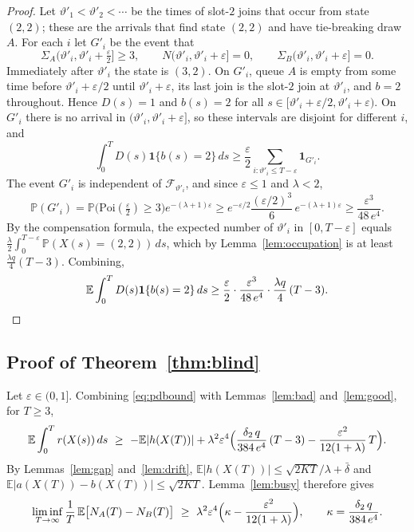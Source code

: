 \documentclass[11pt]{article}
\theoremstyle{definition}
\theoremstyle{remark}
\newcommand{\E}{\mathbb{E}}
\renewcommand{\Pr}{\mathbb{P}}
\newcommand{\ind}{\mathbf{1}}
\newcommand{\cF}{\mathcal{F}}
\newcommand{\SvA}{\Sigma_A}
\newcommand{\SvB}{\Sigma_B}
\newcommand{\Poi}{\mathrm{Poi}}
\begin{document}
\begin{proof}
Let $\vartheta'_1<\vartheta'_2<\cdots$ be the times of slot-$2$ joins that
occur from state $(2,2)$; these are the arrivals that find state $(2,2)$ and
have tie-breaking draw $A$. For each $i$ let $G'_i$ be the event that
\[
  \SvA(\vartheta'_i,\vartheta'_i+\tfrac{\varepsilon}{2}]\ge3,\qquad
  N(\vartheta'_i,\vartheta'_i+\varepsilon]=0,\qquad
  \SvB(\vartheta'_i,\vartheta'_i+\varepsilon]=0 .
\]
Immediately after $\vartheta'_i$ the state is $(3,2)$. On $G'_i$, queue $A$ is
empty from some time before $\vartheta'_i+\varepsilon/2$ until
$\vartheta'_i+\varepsilon$, its last join is the slot-$2$ join at
$\vartheta'_i$, and $b=2$ throughout. Hence $D(s)=1$ and $b(s)=2$ for all
$s\in[\vartheta'_i+\varepsilon/2,\vartheta'_i+\varepsilon)$. On $G'_i$ there is
no arrival in $(\vartheta'_i,\vartheta'_i+\varepsilon]$, so these intervals are
disjoint for different $i$, and
\[
  \int_0^T D(s)\ind\{b(s)=2\}\,ds\ge\frac{\varepsilon}{2}
  \sum_{i:\vartheta'_i\le T-\varepsilon}\ind_{G'_i}.
\]
The event $G'_i$ is independent of $\cF_{\vartheta'_i}$, and since
$\varepsilon\le1$ and $\lambda<2$,
\[
  \Pr(G'_i)=\Pr\bigl(\Poi(\tfrac{\varepsilon}{2})\ge3\bigr)e^{-(\lambda+1)\varepsilon}
  \ge e^{-\varepsilon/2}\frac{(\varepsilon/2)^3}{6}\,e^{-(\lambda+1)\varepsilon}
  \ge\frac{\varepsilon^{3}}{48\,e^{4}} .
\]
By the compensation formula, the expected number of $\vartheta'_i$ in
$[0,T-\varepsilon]$ equals
$\frac{\lambda}{2}\int_0^{T-\varepsilon}\Pr(X(s)=(2,2))\,ds$, which by
Lemma~\ref{lem:occupation} is at least $\frac{\lambda q}{4}(T-3)$. Combining,
\[
  \E\int_0^T D(s)\ind\{b(s)=2\}\,ds\ge\frac{\varepsilon}{2}\cdot
  \frac{\varepsilon^{3}}{48\,e^{4}}\cdot\frac{\lambda q}{4}\,(T-3).\qedhere
\]
\end{proof}

\subsection{Proof of Theorem~\ref{thm:blind}}

Let $\varepsilon\in(0,1]$. Combining \eqref{eq:pdbound} with
Lemmas~\ref{lem:bad} and~\ref{lem:good}, for $T\ge3$,
\[
  \E\int_0^T r(X(s))\,ds\ \ge\ -\E|h(X(T))|
  +\lambda^{2}\varepsilon^{4}\Bigl(\frac{\delta_2\,q}{384\,e^{4}}\,(T-3)
  -\frac{\varepsilon^{2}}{12(1+\lambda)}\,T\Bigr).
\]
By Lemmas~\ref{lem:gap} and~\ref{lem:drift},
$\E|h(X(T))|\le\sqrt{2KT}/\lambda+\bar\delta$ and
$\E|a(X(T))-b(X(T))|\le\sqrt{2KT}$. Lemma~\ref{lem:busy} therefore gives
\begin{equation}\label{eq:liminf}
  \liminf_{T\to\infty}\frac{1}{T}\,\E\bigl[N_A(T)-N_B(T)\bigr]\ \ge\
  \lambda^{2}\varepsilon^{4}\Bigl(\kappa-\frac{\varepsilon^{2}}{12(1+\lambda)}\Bigr),
  \qquad\kappa=\frac{\delta_2\,q}{384\,e^{4}} .
\end{equation}
\end{document}
